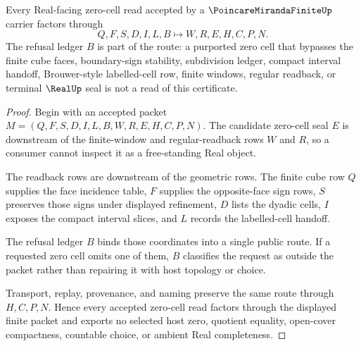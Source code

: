 \begin{theorem}
\label{thm:poincare-miranda-finite-zero-cell-refusal}
Every Real-facing zero-cell read accepted by a $\PoincareMirandaFiniteUp$ carrier factors through
$$
Q,F,S,D,I,L,B \longmapsto W,R,E,H,C,P,N .
$$
The refusal ledger $B$ is part of the route: a purported zero cell that bypasses the finite cube faces, boundary-sign stability, subdivision ledger, compact interval handoff, Brouwer-style labelled-cell row, finite windows, regular readback, or terminal $\RealUp$ seal is not a read of this certificate.
\end{theorem}
\begin{proof}
Begin with an accepted packet $M=(Q,F,S,D,I,L,B,W,R,E,H,C,P,N)$. The candidate zero-cell seal $E$ is downstream of the finite-window and regular-readback rows $W$ and $R$, so a consumer cannot inspect it as a free-standing Real object.

The readback rows are downstream of the geometric rows. The finite cube row $Q$ supplies the face incidence table, $F$ supplies the opposite-face sign rows, $S$ preserves those signs under displayed refinement, $D$ lists the dyadic cells, $I$ exposes the compact interval slices, and $L$ records the labelled-cell handoff.

The refusal ledger $B$ binds those coordinates into a single public route. If a requested zero cell omits one of them, $B$ classifies the request as outside the packet rather than repairing it with host topology or choice.

Transport, replay, provenance, and naming preserve the same route through $H,C,P,N$. Hence every accepted zero-cell read factors through the displayed finite packet and exports no selected host zero, quotient equality, open-cover compactness, countable choice, or ambient Real completeness.
\end{proof}



